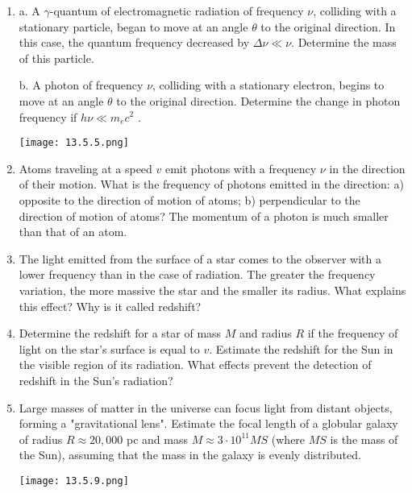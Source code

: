 \documentclass{article}
\begin{document}
\begin{enumerate}[label=13.5.\arabic*]
\item a. A $\gamma$-quantum of electromagnetic radiation of frequency $\nu$, colliding with a stationary particle, began to move at an angle $\theta$ to the original direction. In this case, the quantum frequency decreased by $\Delta \nu \ll \nu$. Determine the mass of this particle.

b. A photon of frequency $\nu$, colliding with a stationary electron, begins to move at an angle $\theta$ to the original direction. Determine the change in photon frequency if $h \nu \ll m_e c^2$ .

\begin{center}
    \texttt{[image: 13.5.5.png]}
\end{center}

\item Atoms traveling at a speed $v$ emit photons with a frequency $\nu$ in the direction of their motion. What is the frequency of photons emitted in the direction: a) opposite to the direction of motion of atoms; b) perpendicular to the direction of motion of atoms? The momentum of a photon is much smaller than that of an atom.

\item The light emitted from the surface of a star comes to the observer with a lower frequency than in the case of radiation. The greater the frequency variation, the more massive the star and the smaller its radius. What explains this effect? Why is it called redshift?

\item Determine the redshift for a star of mass $M$ and radius $R$ if the frequency of light on the star's surface is equal to $v$. Estimate the redshift for the Sun in the visible region of its radiation. What effects prevent the detection of redshift in the Sun's radiation?

\item Large masses of matter in the universe can focus light from distant objects, forming a "gravitational lens". Estimate the focal length of a globular galaxy of radius $R \approx 20,000$ pc and mass $M \approx 3 \cdot 10^{11} MS$ (where $MS$ is the mass of the Sun), assuming that the mass in the galaxy is evenly distributed.

\begin{center}
    \texttt{[image: 13.5.9.png]}
\end{center}



\end{enumerate}
\end{document}
